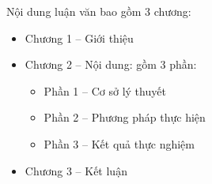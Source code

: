 Nội dung luận văn bao gồm 3 chương:


\begin{itemize}
    \item Chương 1 -- Giới thiệu %
    \item Chương 2 -- Nội dung: gồm 3 phần: %
          \begin{itemize}
              \item Phần 1 -- Cơ sở lý thuyết %
              \item Phần 2 -- Phương pháp thực hiện %
              \item Phần 3 -- Kết quả thực nghiệm %
          \end{itemize}
    \item Chương 3 -- Kết luận %
\end{itemize}
